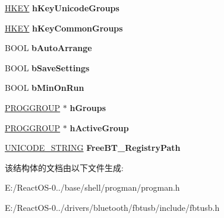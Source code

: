 \begin{DoxyCompactItemize}
\hyperlink{interfacevoid}{H\+K\+EY} {\bfseries h\+Key\+Unicode\+Groups}
\item 
\mbox{\label{struct___g_l_o_b_a_l_s_a79c9da95997491b62d2f033ca386567b}} 
\hyperlink{interfacevoid}{H\+K\+EY} {\bfseries h\+Key\+Common\+Groups}
\item 
\mbox{\label{struct___g_l_o_b_a_l_s_ae730fab58d43a6eb387ae5c20f0d49bb}} 
B\+O\+OL {\bfseries b\+Auto\+Arrange}
\item 
\mbox{\label{struct___g_l_o_b_a_l_s_abff6f65bcf33ba954bf3330cdafab516}} 
B\+O\+OL {\bfseries b\+Save\+Settings}
\item 
\mbox{\label{struct___g_l_o_b_a_l_s_ab491b1f64d786ee085496961726adb72}} 
B\+O\+OL {\bfseries b\+Min\+On\+Run}
\item 
\mbox{\label{struct___g_l_o_b_a_l_s_a3a549a7f82988e3316719de48484a2e7}} 
\hyperlink{struct___p_r_o_g_g_r_o_u_p}{P\+R\+O\+G\+G\+R\+O\+UP} $\ast$ {\bfseries h\+Groups}
\item 
\mbox{\label{struct___g_l_o_b_a_l_s_ab6024e4469b9ee363df7db36b7e48086}} 
\hyperlink{struct___p_r_o_g_g_r_o_u_p}{P\+R\+O\+G\+G\+R\+O\+UP} $\ast$ {\bfseries h\+Active\+Group}
\item 
\mbox{\label{struct___g_l_o_b_a_l_s_a64460b3659e4dab8caab1a980fbe4e8c}} 
\hyperlink{struct___u_n_i_c_o_d_e___s_t_r_i_n_g}{U\+N\+I\+C\+O\+D\+E\+\_\+\+S\+T\+R\+I\+NG} {\bfseries Free\+B\+T\+\_\+\+Registry\+Path}
\end{DoxyCompactItemize}


该结构体的文档由以下文件生成\+:\begin{DoxyCompactItemize}
\item 
E\+:/\+React\+O\+S-\/0../base/shell/progman/progman.\+h\item 
E\+:/\+React\+O\+S-\/0../drivers/bluetooth/fbtusb/include/fbtusb.\+h\end{DoxyCompactItemize}
